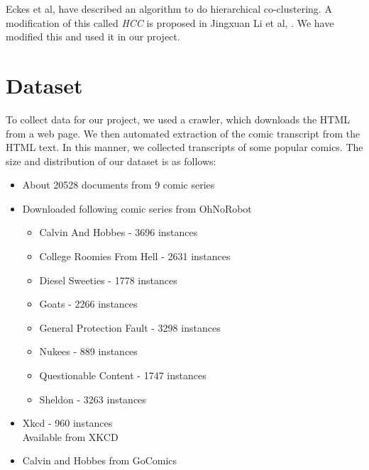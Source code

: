 \documentclass[11pt]{article}
\begin{document}
Eckes et al, \cite{HCC2} have described an algorithm to do hierarchical co-clustering. A modification of this called \emph{HCC} is proposed in Jingxuan Li et al, \cite{HCC1}. We have modified this and used it in our project.

\section{Dataset}
To collect data for our project, we used a crawler, which downloads the HTML from a web page. We then automated extraction of the comic transcript from the HTML text. In this manner, we collected transcripts of some popular comics. The size and distribution of our dataset is as follows:
\begin{itemize}
\item
  About 20528 documents from 9 comic series
\item
  Downloaded following comic series from OhNoRobot\cite{robot}
  \begin{itemize}
  \item
    Calvin And Hobbes - 3696 instances
  \item
    College Roomies From Hell - 2631 instances
  \item
    Diesel Sweeties - 1778 instances
  \item
    Goats - 2266 instances
  \item
    General Protection Fault - 3298 instances
  \item
    Nukees - 889 instances
  \item
    Questionable Content -  1747 instances
  \item
    Sheldon - 3263 instances
  \end{itemize}
\item
  Xkcd - 960 instances\\
  Available from XKCD \cite{xkcd}
\item
  Calvin and Hobbes from GoComics\cite{go}
\end{itemize}
\end{document}

